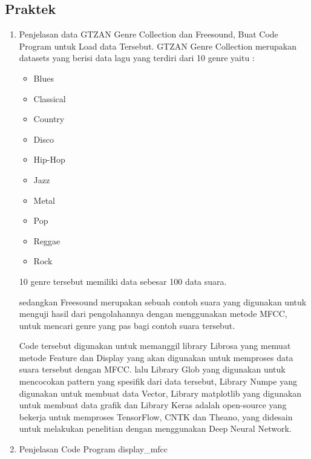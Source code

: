     \subsection{Praktek}
        \begin{enumerate}
            \item Penjelasan data GTZAN Genre Collection dan Freesound, Buat Code Program untuk Load data Tersebut.
            \subitem GTZAN Genre Collection merupakan datasets yang berisi data lagu yang terdiri dari 10 genre yaitu :
            \begin{itemize}
            \item Blues
            \item Classical
            \item Country
            \item Disco
            \item Hip-Hop
            \item Jazz
            \item Metal
            \item Pop
            \item Reggae
            \item Rock
            \end{itemize}
            10 genre tersebut memiliki data sebesar 100 data suara.
            
            \subitem sedangkan Freesound merupakan sebuah contoh suara yang digunakan untuk menguji hasil dari pengolahannya dengan menggunakan metode MFCC, untuk mencari genre yang pas bagi contoh suara tersebut.
            
            
            
            \subitem Code tersebut digunakan untuk memanggil library Librosa yang memuat metode Feature dan Display yang akan digunakan untuk memproses data suara tersebut dengan MFCC. lalu Library Glob yang digunakan untuk mencocokan pattern yang spesifik dari data tersebut, Library Numpe yang digunakan untuk membuat data Vector, Library matplotlib yang digunakan untuk membuat data grafik dan Library Keras adalah open-source yang bekerja untuk memproses TensorFlow, CNTK dan Theano, yang didesain untuk melakukan penelitian dengan menggunakan Deep Neural Network.
            
            \item Penjelasan Code Program display\_mfcc
            

\end{enumerate}

